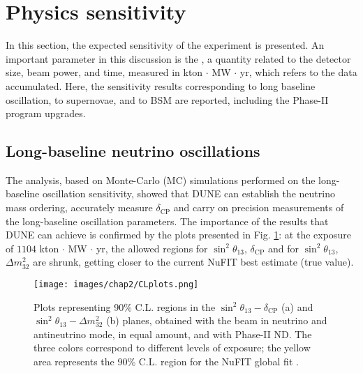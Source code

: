 
\section{Physics sensitivity}
In this section, the expected sensitivity of the experiment is presented. An important parameter in this discussion is the , a quantity related to the detector size, beam power, and time, measured in kton $\cdot$ MW $\cdot$ yr, which refers to the data accumulated. Here, the sensitivity results corresponding to long baseline oscillation, to supernovae, and to BSM are reported, including the Phase-II program upgrades.

\subsection{Long-baseline neutrino oscillations}
The analysis, based on Monte-Carlo (MC) simulations performed on the long-baseline oscillation sensitivity, showed that DUNE can establish the neutrino mass ordering, accurately measure  $\delta_{\text{CP}}$ and carry on precision measurements of the long-baseline oscillation parameters. The importance of the results that DUNE can achieve is confirmed by the plots presented in Fig. \ref{fig:CLplots}: at the exposure of $1104$ kton $\cdot$ MW $\cdot$ yr, the allowed regions for $\sin^2\theta_{13}$, $\delta_{\text{CP}}$ and for $\sin^2\theta_{13}$, $\Delta m^2_{32}$ are shrunk, getting closer to the current NuFIT best estimate (true value).

\begin{figure}
    \centering
    \texttt{[image: images/chap2/CLplots.png]}
    \caption{Plots representing 90\% C.L. regions in the $\sin^2\theta_{13} - \delta_{\text{CP}}$ (a) and $\sin^2\theta_{13} - \Delta m^2_{32}$ (b) planes, obtained with the beam in neutrino and antineutrino mode, in equal amount, and with Phase-II ND. The three colors correspond to different levels of exposure; the yellow area represents the 90\% C.L. region for the NuFIT global fit \cite{dunecollaboration2022snowmass}.}
    \label{fig:CLplots}
\end{figure}

